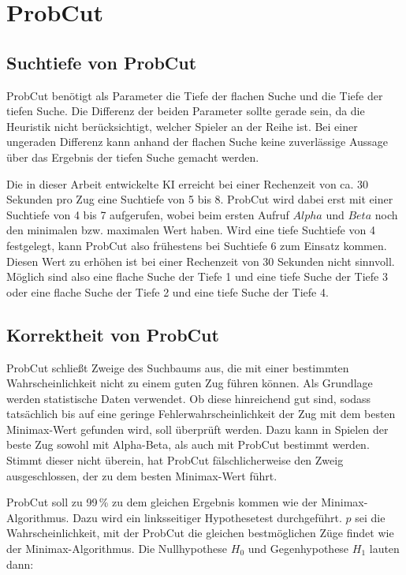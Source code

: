 
\section{ProbCut}

\subsection{Suchtiefe von ProbCut}
ProbCut benötigt als Parameter die Tiefe der flachen Suche und die Tiefe der tiefen Suche. Die Differenz der beiden
Parameter sollte gerade sein, da die Heuristik nicht berücksichtigt, welcher Spieler an der Reihe ist. Bei einer
ungeraden Differenz kann anhand der flachen Suche keine zuverlässige Aussage über das Ergebnis der tiefen Suche gemacht
werden.

Die in dieser Arbeit entwickelte \ac{KI} erreicht bei einer Rechenzeit von ca. 30 Sekunden pro Zug eine Suchtiefe von 5 bis
8. ProbCut wird dabei erst mit einer Suchtiefe von 4 bis 7 aufgerufen, wobei beim ersten Aufruf $Alpha$ und $Beta$ noch
den minimalen bzw. maximalen Wert haben. Wird eine tiefe Suchtiefe von 4 festgelegt, kann ProbCut also frühestens bei
Suchtiefe 6 zum Einsatz kommen. Diesen Wert zu erhöhen ist bei einer Rechenzeit von 30 Sekunden nicht sinnvoll. Möglich
sind also eine flache Suche der Tiefe 1 und eine tiefe Suche der Tiefe 3 oder eine flache Suche der Tiefe 2 und eine
tiefe Suche der Tiefe 4.

\subsection{Korrektheit von ProbCut}
ProbCut schließt Zweige des Suchbaums aus, die mit einer bestimmten Wahrscheinlichkeit nicht zu einem guten Zug führen
können. Als Grundlage werden statistische Daten verwendet. Ob diese hinreichend gut sind, sodass tatsächlich bis auf
eine geringe Fehlerwahrscheinlichkeit der Zug mit dem besten Minimax-Wert gefunden wird, soll überprüft werden. Dazu
kann in Spielen der beste Zug sowohl mit Alpha-Beta, als auch mit ProbCut bestimmt werden. Stimmt dieser nicht überein,
hat ProbCut fälschlicherweise den Zweig ausgeschlossen, der zu dem besten Minimax-Wert führt.

ProbCut soll zu 99\,\% zu dem gleichen Ergebnis kommen wie der Minimax-Algorithmus. Dazu wird ein linksseitiger
Hypothesetest durchgeführt. $p$ sei die Wahrscheinlichkeit, mit der ProbCut die gleichen bestmöglichen Züge findet wie
der Minimax-Algorithmus. Die Nullhypothese $H_0$ und Gegenhypothese $H_1$ lauten dann:

